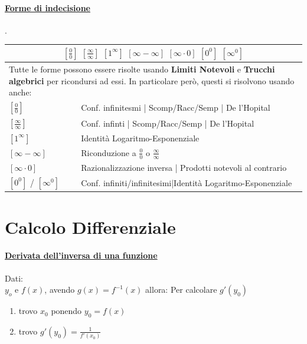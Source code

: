\documentclass[12pt, a4paper]{article}
\begin{document}
\paragraph*{\underline{Forme di indecisione}}.\\
\begin{tabularx}{\textwidth}{|l|X|}
	\hline
	\multicolumn{2}{|c|}{
		$[\frac{0}{0}]$ $[\frac{\infty}{\infty}]$ $[1^\infty]$ $[\infty - \infty]$ $[\infty \cdot 0]$ $[0^0]$ $[\infty^0]$
	}                                                                                         \\
	\hline
	\multicolumn{2}{|X|}{
		\small{Tutte le forme possono essere risolte usando \textbf{Limiti Notevoli} e \textbf{Trucchi algebrici} per ricondursi ad essi.
			In particolare però, questi si risolvono usando anche:}
	}                                                                                         \\
	\hline
	$[\frac{0}{0}]$           & Conf. infinitesmi | Scomp/Racc/Semp | De l'Hopital            \\
	\hline
	$[\frac{\infty}{\infty}]$ & Conf. infinti | Scomp/Racc/Semp | De l'Hopital                \\
	\hline
	$[1^\infty]$              & Identità Logaritmo-Esponenziale                               \\
	\hline
	$[\infty - \infty]$       & Riconduzione a $\frac{0}{0}$ o $\frac{\infty}{\infty}$        \\
	\hline
	$[\infty \cdot 0]$        & Razionalizzazione inversa | Prodotti notevoli al contrario    \\
	\hline
	$[0^0]$ / $[\infty^0]$    & Conf. infiniti/infinitesimi|Identità Logaritmo-Esponenziale \\
	\hline
\end{tabularx}


\section*{Calcolo Differenziale}

\paragraph*{\underline{Derivata dell'inversa di una funzione}}
Dati:\\
$y_o$ e $f(x)$, avendo $g(x) = f^{-1}(x)$ allora:
Per calcolare $g'(y_0)$
\begin{enumerate}
	\item trovo $x_0$ ponendo $y_0=f(x)$
	\item trovo $g'(y_0)=\frac{1}{f'(x_0)}$
\end{enumerate}
\end{document}
